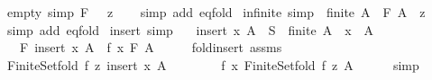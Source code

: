 \begin{isabellebody}
\ empty\ {\isacharbrackleft}{\kern0pt}simp{\isacharbrackright}{\kern0pt}{\isacharcolon}{\kern0pt}\ {\isachardoublequoteopen}F\ {\isacharbraceleft}{\kern0pt}{\isacharbraceright}{\kern0pt}\ {\isacharequal}{\kern0pt}\ z{\isachardoublequoteclose}\isanewline
%
\isadelimproof
\ \ %
\endisadelimproof
%
\isatagproof
{}\isamarkupfalse%
\ {\isacharparenleft}{\kern0pt}simp\ add{\isacharcolon}{\kern0pt}\ eq{\isacharunderscore}{\kern0pt}fold{\isacharparenright}{\kern0pt}%
\endisatagproof
{\isafoldproof}%
%
\isadelimproof
\isanewline
%
\endisadelimproof
\isanewline
{}\isamarkupfalse%
\ infinite\ {\isacharbrackleft}{\kern0pt}simp{\isacharbrackright}{\kern0pt}{\isacharcolon}{\kern0pt}\ {\isachardoublequoteopen}{\isasymnot}\ finite\ A\ {\isasymLongrightarrow}\ F\ A\ {\isacharequal}{\kern0pt}\ z{\isachardoublequoteclose}\isanewline
%
\isadelimproof
\ \ %
\endisadelimproof
%
\isatagproof
{}\isamarkupfalse%
\ {\isacharparenleft}{\kern0pt}simp\ add{\isacharcolon}{\kern0pt}\ eq{\isacharunderscore}{\kern0pt}fold{\isacharparenright}{\kern0pt}%
\endisatagproof
{\isafoldproof}%
%
\isadelimproof
\isanewline
%
\endisadelimproof
\isanewline
{}\isamarkupfalse%
\ insert\ {\isacharbrackleft}{\kern0pt}simp{\isacharbrackright}{\kern0pt}{\isacharcolon}{\kern0pt}\isanewline
\ \ \ {\isachardoublequoteopen}insert\ x\ A\ {\isasymsubseteq}\ S{\isachardoublequoteclose}\ \ {\isachardoublequoteopen}finite\ A{\isachardoublequoteclose}\ \ {\isachardoublequoteopen}x\ {\isasymnotin}\ A{\isachardoublequoteclose}\isanewline
\ \ \ {\isachardoublequoteopen}F\ {\isacharparenleft}{\kern0pt}insert\ x\ A{\isacharparenright}{\kern0pt}\ {\isacharequal}{\kern0pt}\ f\ x\ {\isacharparenleft}{\kern0pt}F\ A{\isacharparenright}{\kern0pt}{\isachardoublequoteclose}\isanewline
%
\isadelimproof
%
\endisadelimproof
%
\isatagproof
{}\isamarkupfalse%
\ {\isacharminus}{\kern0pt}\isanewline
\ \ \isamarkupfalse%
\ fold{\isacharunderscore}{\kern0pt}insert\ assms\isanewline
\ \ \isamarkupfalse%
\ {\isachardoublequoteopen}Finite{\isacharunderscore}{\kern0pt}Set{\isachardot}{\kern0pt}fold\ f\ z\ {\isacharparenleft}{\kern0pt}insert\ x\ A{\isacharparenright}{\kern0pt}\ \isanewline
\ \ \ \ \ \ {\isacharequal}{\kern0pt}\ f\ x\ {\isacharparenleft}{\kern0pt}Finite{\isacharunderscore}{\kern0pt}Set{\isachardot}{\kern0pt}fold\ f\ z\ A{\isacharparenright}{\kern0pt}{\isachardoublequoteclose}\isanewline
\ \ \ \ \isamarkupfalse%
\ simp\isanewline
\ \ \isamarkupfalse%

\end{isabellebody}

